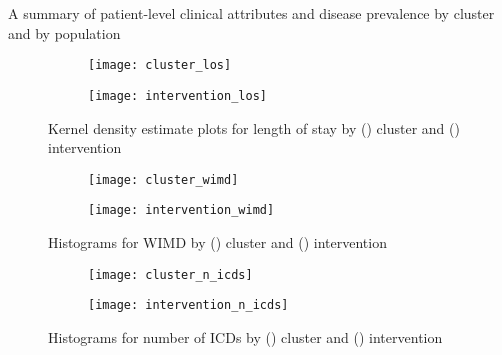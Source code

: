 \begin{table}
    \centering
    \resizebox{\textwidth}{!}{%
        
    }\caption{A summary of patient-level clinical attributes and disease
    prevalence by cluster and by population}\label{tab:summary}
\end{table}

\begin{figure}
    \centering
    \begin{subfigure}{\halfimgwidth}
        \texttt{[image: cluster\_los]}
        \caption{}\label{fig:cluster_los}
    \end{subfigure}\hfill%
    \begin{subfigure}{\halfimgwidth}
        \texttt{[image: intervention\_los]}
        \caption{}\label{fig:intervention_los}
    \end{subfigure}
    \caption{%
        Kernel density estimate plots for length of stay by
        () cluster and ()
        intervention
    }\label{fig:los_kde}
\end{figure}

\begin{figure}
    \centering
    \begin{subfigure}{\halfimgwidth}
        \texttt{[image: cluster\_wimd]}
        \caption{}\label{fig:cluster_wimd}
    \end{subfigure}\hfill%
    \begin{subfigure}{\halfimgwidth}
        \texttt{[image: intervention\_wimd]}
        \caption{}\label{fig:intervention_wimd}
    \end{subfigure}
    \caption{%
        Histograms for WIMD by () cluster and
        () intervention
    }\label{fig:wimd_hist}
\end{figure}

\begin{figure}
    \centering
    \begin{subfigure}{\halfimgwidth}
        \texttt{[image: cluster\_n\_icds]}
        \caption{}\label{fig:cluster_n_icds}
    \end{subfigure}\hfill%
    \begin{subfigure}{\halfimgwidth}
        \texttt{[image: intervention\_n\_icds]}
        \caption{}\label{fig:intervention_n_icds}
    \end{subfigure}
    \caption{%
        Histograms for number of ICDs by () cluster
        and () intervention
    }\label{fig:n_icds_hist}
\end{figure}

